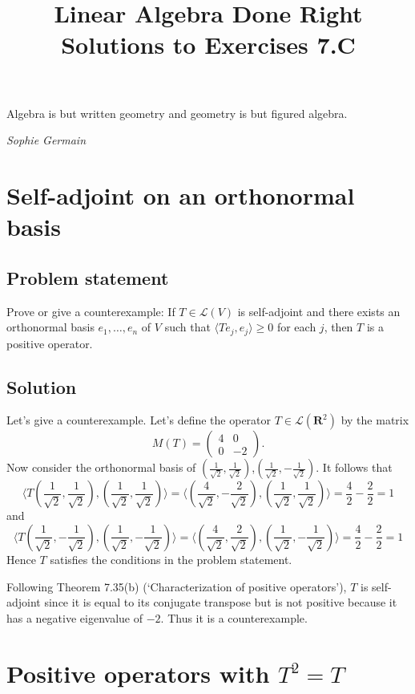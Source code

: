 \documentclass{article}
\title{Linear Algebra Done Right\\Solutions to Exercises 7.C}
\author{}
\date{}
\begin{document}
\maketitle

\epigraph{Algebra is but written geometry and geometry is but figured algebra.}{\textit{Sophie Germain}}

\section{Self-adjoint on an orthonormal basis}
\subsection*{Problem statement}
Prove or give a counterexample: If $T\in\mathcal{L}(V)$ is self-adjoint and there exists an orthonormal basis $e_1,\ldots,e_n$ of $V$ such that $\langle Te_j,e_j\rangle \geq 0$ for each $j$, then $T$ is a positive operator.

\subsection*{Solution}
Let's give a counterexample. Let's define the operator $T\in\mathcal{L}(\mathbf{R}^2)$ by the matrix
\[M(T) = \begin{pmatrix}4 & 0 \\0 & -2\end{pmatrix}.\]
Now consider the orthonormal basis of $(\frac{1}{\sqrt{2}},\frac{1}{\sqrt{2}})$,$(\frac{1}{\sqrt{2}},-\frac{1}{\sqrt{2}})$. It follows that 
\[\langle T(\frac{1}{\sqrt{2}},\frac{1}{\sqrt{2}}),(\frac{1}{\sqrt{2}},\frac{1}{\sqrt{2}})\rangle=\langle (\frac{4}{\sqrt{2}},-\frac{2}{\sqrt{2}}),(\frac{1}{\sqrt{2}},\frac{1}{\sqrt{2}}) \rangle = \frac{4}{2} -\frac{2}{2}=1 \]
and
\[\langle T(\frac{1}{\sqrt{2}},-\frac{1}{\sqrt{2}}),(\frac{1}{\sqrt{2}},-\frac{1}{\sqrt{2}})\rangle=\langle (\frac{4}{\sqrt{2}},\frac{2}{\sqrt{2}}),(\frac{1}{\sqrt{2}},-\frac{1}{\sqrt{2}}) \rangle = \frac{4}{2} -\frac{2}{2}=1 \]
Hence $T$ satisfies the conditions in the problem statement.

Following Theorem 7.35(b) (`Characterization of positive operators'), $T$ is self-adjoint since it is equal to its conjugate transpose but is not positive because it has a negative eigenvalue of $-2$. Thus it is a counterexample.

\clearpage

\section{Positive operators with $T^2=T$}
\end{document}
